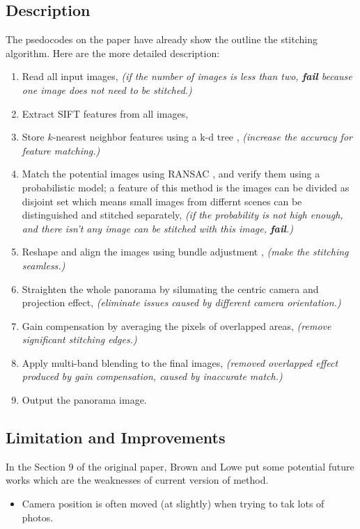 \documentclass[10pt,twocolumn,letterpaper]{article}
\begin{document}
\subsection{Description}
The psedocodes on the paper have already show the outline the stitching algorithm.
Here are the more detailed description:
\begin{enumerate}
    \item
        Read all input images,
        \textit{(if the number of images is less than two, \textbf{fail} because one image does not need to be stitched.)}
    \item \label{n:e}
        Extract SIFT \cite{sift} features from all images,
    \item \label{n:k}
        Store $k$-nearest neighbor features using a k-d tree \cite{knn},
        \textit{(increase the accuracy for feature matching.)}
    \item \label{n:m}
        Match the potential images using RANSAC \cite{ransac}, and verify them using a probabilistic model;
        a feature of this method is the images can be divided as disjoint set which means small images from differnt scenes can be distinguished and stitched separately,
        \textit{(if the probability is not high enough, and there isn't any image can be stitched with this image, \textbf{fail}.)}
    \item \label{n:r}
        Reshape and align the images using bundle adjustment \cite{bm},
        \textit{(make the stitching seamless.)}
    \item \label{n:s}
        Straighten the whole panorama by silumating the centric camera and projection effect,
        \textit{(eliminate issues caused by different camera orientation.)}
    \item \label{n:g}
        Gain compensation by averaging the pixels of overlapped areas,
        \textit{(remove significant stitching edges.)}
    \item \label{n:a}
        Apply multi-band blending to the final images,
        \textit{(removed overlapped effect produced by gain compensation, caused by inaccurate match.)}
    \item \label{n:o}
        Output the panorama image.
\end{enumerate}


\subsection{Limitation and Improvements}
In the Section 9 of the original paper, Brown and Lowe put some potential future works which are the weaknesses of current version of method.
\begin{itemize}
    \item Camera position is often moved (at slightly) when trying to tak lots of photos.
\end{itemize}
\end{document}
